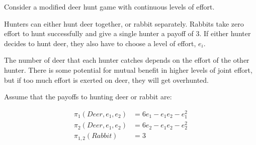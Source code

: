 \documentclass[addpoints]{exam}
\begin{document}
\begin{questions}
\begin{parts}
\end{parts}

\newpage

\question

Consider a modified deer hunt game with continuous levels of effort.

Hunters can either hunt deer together, or rabbit separately.
Rabbits take zero effort to hunt successfully and give a single hunter a payoff of 3.
If either hunter decides to hunt deer, they also have to choose a level of effort, $e_i$.

The number of deer that each hunter catches depends on the effort of the other hunter.
There is some potential for mutual benefit in higher levels of joint effort,
but if too much effort is exerted on deer, they will get overhunted.

Assume that the payoffs to hunting deer or rabbit are:

\begin{align*}
  \pi_1(Deer, e_1,e_2) & = 6e_1 - e_1e_2 - e_1^2 \\
  \pi_2(Deer, e_1,e_2) & = 6e_2 - e_1e_2 - e_2^2 \\
  \pi_{1,2}(Rabbit) & = 3
\end{align*}

\end{questions}
\end{document}
